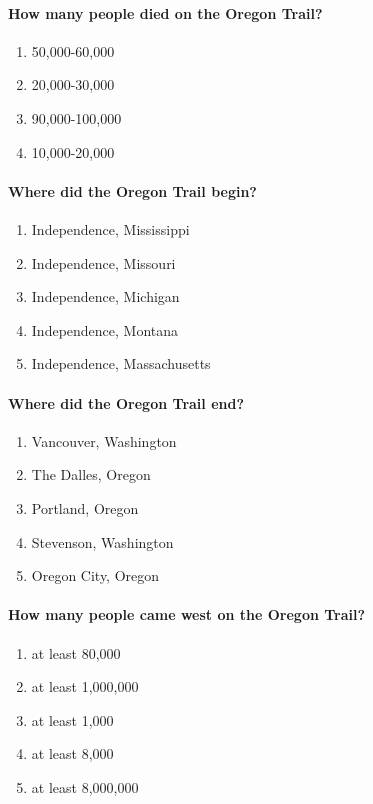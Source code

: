 		\paragraph{How many people died on the Oregon Trail?}
			\begin{enumerate}
				\item 50,000-60,000
				\item 20,000-30,000
				\item 90,000-100,000
				\item 10,000-20,000
			\end{enumerate}

		\paragraph{Where did the Oregon Trail begin?}
			\begin{enumerate}
				\item Independence, Mississippi
				\item Independence, Missouri
				\item Independence, Michigan
				\item Independence, Montana
				\item Independence, Massachusetts
			\end{enumerate}

		\paragraph{Where did the Oregon Trail end?}
			\begin{enumerate}
				\item Vancouver, Washington
				\item The Dalles, Oregon
				\item Portland, Oregon
				\item Stevenson, Washington
				\item Oregon City, Oregon
			\end{enumerate}

		\paragraph{How many people came west on the Oregon Trail?}
			\begin{enumerate}
				\item at least 80,000
				\item at least 1,000,000
				\item at least 1,000
				\item at least 8,000
				\item at least 8,000,000
			\end{enumerate}

